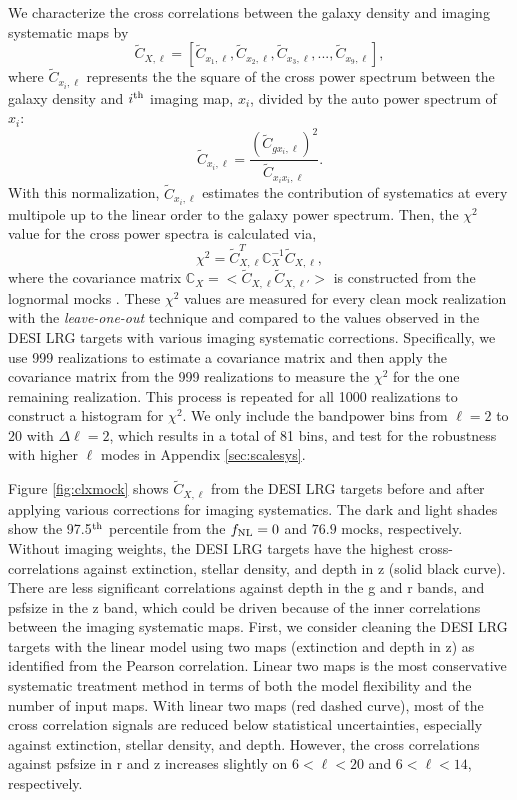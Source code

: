 We characterize the cross correlations between the galaxy density and imaging systematic maps by
\begin{equation}
\tilde{C}_{X, \ell} = [\tilde{C}_{x_{1}, \ell}, \tilde{C}_{x_{2}, \ell}, \tilde{C}_{x_{3}, \ell}, ..., \tilde{C}_{x_{9}, \ell}],
\end{equation}
where $\tilde{C}_{x_{i}, \ell}$ represents the the square of the cross power spectrum between the galaxy density and $i^{\rm th}$ imaging map, $x_{i}$, divided by the auto power spectrum of $x_{i}$:
\begin{equation}\label{eq:cx}
\tilde{C}_{x_{i}, \ell} = \frac{(\tilde{C}_{gx_{i}, \ell})^{2}}{\tilde{C}_{x_{i}x_{i},\ell}}.
\end{equation}
With this normalization, $\tilde{C}_{x_{i}, \ell}$ estimates the contribution of systematics at every multipole up to the linear order to the galaxy power spectrum. Then, the $\chi^{2}$ value for the cross power spectra is calculated via,
\begin{equation}\label{eq:cx_chi2}
\chi^{2} = \tilde{C}^{T}_{X, \ell} \mathbb{C}_{X}^{-1} \tilde{C}_{X, \ell},
\end{equation}
where the covariance matrix $\mathbb{C}_{X} = < \tilde{C}_{X, \ell} \tilde{C}_{X, \ell'} >$ is constructed from the lognormal mocks . These $\chi^{2}$ values are measured for every clean mock realization with the \textit{leave-one-out} technique and compared to the values observed in the DESI LRG targets with various imaging systematic corrections. Specifically, we use 999 realizations to estimate a covariance matrix and then apply the covariance matrix from the 999 realizations to measure the $\chi^{2}$ for the one remaining realization. This process is repeated for all 1000 realizations to construct a histogram for $\chi^{2}$. We only include the bandpower bins from $\ell=2$ to $20$ with $\Delta\ell=2$, which results in a total of 81 bins, and test for the robustness with higher $\ell$ modes in Appendix \ref{sec:scalesys}. 

Figure \ref{fig:clxmock} shows $\tilde{C}_{X,\ell}$ from the DESI LRG targets before and after applying various corrections for imaging systematics. The dark and light shades show the 97.5$^{\rm th}$ percentile from the $f_{\rm NL}=0$ and $76.9$ mocks, respectively. Without imaging weights, the DESI LRG targets have the highest cross-correlations against extinction, stellar density, and depth in z (solid black curve). There are less significant correlations against depth in the g and r bands, and psfsize in the z band, which could be driven because of the inner correlations between the imaging systematic maps. First, we consider cleaning the DESI LRG targets with the linear model using two maps (extinction and depth in z) as identified from the Pearson correlation. Linear two maps is the most conservative systematic treatment method in terms of both the model flexibility and the number of input maps. With linear two maps (red dashed curve), most of the cross correlation signals are reduced below statistical uncertainties, especially against extinction, stellar density, and depth. However, the cross correlations against psfsize in r and z increases slightly on $6<\ell<20$ and $6<\ell<14$, respectively. 

